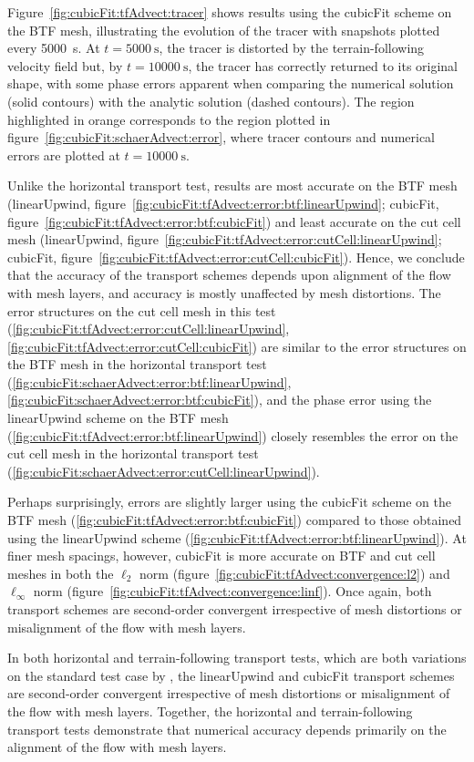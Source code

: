 Figure~\ref{fig:cubicFit:tfAdvect:tracer} shows results using the cubicFit scheme on the BTF mesh, illustrating the evolution of the tracer with snapshots plotted every \SI{5000}{\second}.  At $t = \SI{5000}{\second}$, the tracer is distorted by the terrain-following velocity field but, by $t = \SI{10000}{\second}$, the tracer has correctly returned to its original shape, with some phase errors apparent when comparing the numerical solution (solid contours) with the analytic solution (dashed contours).  The region highlighted in orange corresponds to the region plotted in figure~\ref{fig:cubicFit:schaerAdvect:error}, where tracer contours and numerical errors are plotted at $t = \SI{10000}{\second}$.

Unlike the horizontal transport test, results are most accurate on the BTF mesh (linearUpwind, figure~\ref{fig:cubicFit:tfAdvect:error:btf:linearUpwind}; cubicFit, figure~\ref{fig:cubicFit:tfAdvect:error:btf:cubicFit}) and least accurate on the cut cell mesh
(linearUpwind, figure~\ref{fig:cubicFit:tfAdvect:error:cutCell:linearUpwind}; cubicFit, figure~\ref{fig:cubicFit:tfAdvect:error:cutCell:cubicFit}).
Hence, we conclude that the accuracy of the transport schemes depends upon alignment of the flow with mesh layers, and accuracy is mostly unaffected by mesh distortions.
The error structures on the cut cell mesh in this test (\ref{fig:cubicFit:tfAdvect:error:cutCell:linearUpwind}, \ref{fig:cubicFit:tfAdvect:error:cutCell:cubicFit}) are similar to the error structures on the BTF mesh in the horizontal transport test (\ref{fig:cubicFit:schaerAdvect:error:btf:linearUpwind}, \ref{fig:cubicFit:schaerAdvect:error:btf:cubicFit}), and the phase error using the linearUpwind scheme on the BTF mesh (\ref{fig:cubicFit:tfAdvect:error:btf:linearUpwind}) closely resembles the error on the cut cell mesh in the horizontal transport test (\ref{fig:cubicFit:schaerAdvect:error:cutCell:linearUpwind}).

Perhaps surprisingly, errors are slightly larger using the cubicFit scheme on the BTF mesh (\ref{fig:cubicFit:tfAdvect:error:btf:cubicFit}) compared to those obtained using the linearUpwind scheme (\ref{fig:cubicFit:tfAdvect:error:btf:linearUpwind}).
At finer mesh spacings, however, cubicFit is more accurate on BTF and cut cell meshes in both the $\ell_2$ norm (figure~\ref{fig:cubicFit:tfAdvect:convergence:l2}) and $\ell_\infty$ norm (figure~\ref{fig:cubicFit:tfAdvect:convergence:linf}).  Once again, both transport schemes are second-order convergent irrespective of mesh distortions or misalignment of the flow with mesh layers.

In both horizontal and terrain-following transport tests, which are both variations on the standard test case by \citet{schaer2002}, the linearUpwind and cubicFit transport schemes are second-order convergent irrespective of mesh distortions or misalignment of the flow with mesh layers.
Together, the horizontal and terrain-following transport tests demonstrate that numerical accuracy depends primarily on the alignment of the flow with mesh layers.
